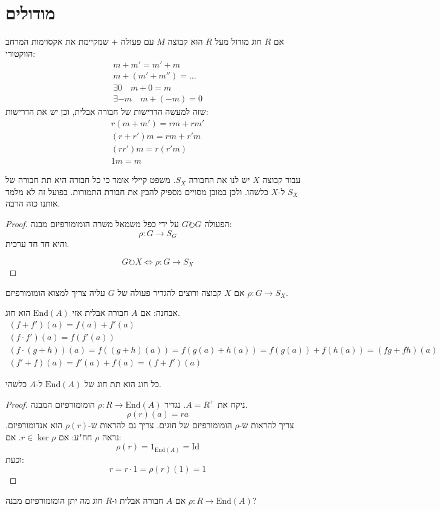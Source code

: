 \documentclass{tstextbook}
\begin{document}
\section{מודולים}

\begin{definition}[מודול]
אם \(R\) חוג מודול מעל \(R\) הוא קבוצה \(M\) עם פעולה \(+\) שמקיימת את אקסוימות המרחב הווקטורי:
\begin{gather*}m+m'=m'+m \\m+(m'+m'')=\dots \\\exists 0 \quad m+0=m \\\exists-m \quad m+(-m)=0
\end{gather*}
שזה למעשה הדרישות של חבורה אבלית, וכן יש את הדרישות:
\begin{gather*}r(m+m')=r m + rm'  \\(r+r')m=r m + r' m \\(rr')m=r(r'm) \\1m = m
\end{gather*}

\end{definition}
עבור קבוצה \(X\) יש לנו את החבורה \(S_{X}\). משפט קיילי אומר כי כל חבורה היא תת חבורה של \(S_{X}\) ל-\(X\) כלשהו. ולכן במובן מסויים מספיק להבין את חבורת התמורות. בפועל זה לא מלמד אותנו כזה הרבה.

\begin{proof}
הפעולה \(G \circlearrowright G\) על ידי כפל משמאל משרה הומומורפיזם מבנה:
$$\rho:G\to S_{G}$$
והיא חד חד ערכית.

$$G\circlearrowright X \iff \rho:G\to S_{X}$$

\end{proof}
אם \(X\) קבוצה ורוצים להגדיר פעולה של \(G\) עליה צריך למצוא הומומורפיזם \(\rho:G\to S_{X}\). 

אבחנה: אם \(A\) חבורה אבלית אזי \(\text{End}(A)\) הוא חוג.
\begin{gather*}(f+f')(a)=f(a)+f'(a)\\ (f\cdot f')(a)=f(f'(a)) \\(f\cdot(g+h))(a)=f((g+h)(a))=f(g(a)+h(a))=f(g(a))+f(h(a))=(fg+fh)(a) \\(f'+f)(a)=f'(a)+f(a)=(f+f')(a)
\end{gather*}

\begin{theorem}
כל חוג הוא תת חוג של \(\text{End}(A)\) ל-\(A\) כלשהי.

\end{theorem}
\begin{proof}
ניקח את \(A=R^{+}\). נגדיר \(\rho:R\to \mathrm{End}(A)\) הומומורפיזם המבנה.
$$\rho(r)(a)=ra$$
צריך להראות ש-\(\rho\) הומומורפיזם של חוגים.
צריך גם להראות ש-\(\rho(r)\) הוא אנדומורפיזם.
נראה \(\rho\) חח"ע: אם \(r \in \ker \rho\). אם:
$$\rho(r)=1_{\text{End}(A)}=\mathrm{Id}$$
וכעת:
$$r=r\cdot 1=\rho(r)(1)=1$$

\end{proof}
אם \(A\) חבורה אבלית ו-\(R\) חוג מה יתן הומומורפיזם מבנה \(\rho:R\to \mathrm{End}(A)\)?
\end{document}
